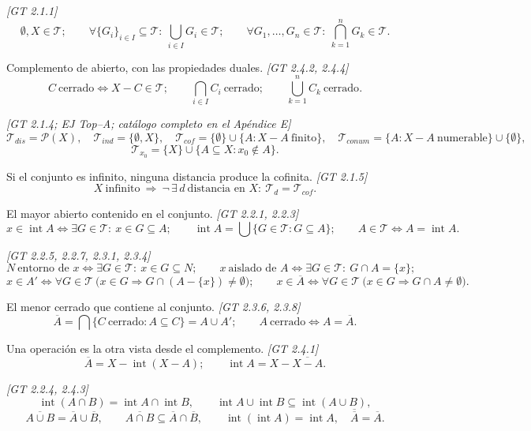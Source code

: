 \documentclass[11pt,a4paper]{article}
\theoremstyle{definition}
\theoremstyle{plain}
\newcommand{\fnt}[1]{{\normalfont\small\itshape\color{gray!150!black}[#1]}}
\newcommand{\cl}[1]{\overline{#1}}
\newcommand{\intr}{\operatorname{int}}
\newcommand{\tp}{\mathcal{T}}
\begin{document}
\begin{itemize}[leftmargin=1.3em,itemsep=3pt]

 \fnt{GT 2.1.1}
\[ \emptyset,X\in\tp;\qquad \forall\{G_i\}_{i\in I}\subseteq\tp:\ \bigcup_{i\in I}G_i\in\tp;\qquad \forall G_1,\dots,G_n\in\tp:\ \bigcap_{k=1}^n G_k\in\tp. \]

 Complemento de abierto, con las propiedades duales. \fnt{GT 2.4.2, 2.4.4}
\[ C\ \text{cerrado}\iff X-C\in\tp;\qquad \bigcap_{i\in I}C_i\ \text{cerrado};\qquad \bigcup_{k=1}^{n}C_k\ \text{cerrado}. \]

 \fnt{GT 2.1.4; EJ Top--A; catálogo completo en el Apéndice E}
\[ \tp_{dis}=\mathcal P(X),\quad \tp_{ind}=\{\emptyset,X\},\quad
\tp_{cof}=\{\emptyset\}\cup\{A: X-A\ \text{finito}\},\quad
\tp_{conum}=\{A: X-A\ \text{numerable}\}\cup\{\emptyset\}, \]
\[ \tp_{x_0}=\{X\}\cup\{A\subseteq X: x_0\notin A\}. \]

 Si el conjunto es infinito, ninguna distancia produce la cofinita. \fnt{GT 2.1.5}
\[ X\ \text{infinito}\ \Rightarrow\ \neg\,\exists\,d\ \text{distancia en } X:\ \tp_d=\tp_{cof}. \]

 El mayor abierto contenido en el conjunto. \fnt{GT 2.2.1, 2.2.3}
\[ x\in\intr A\iff \exists G\in\tp:\ x\in G\subseteq A;\qquad \intr A=\bigcup\{G\in\tp: G\subseteq A\};\qquad A\in\tp\iff A=\intr A. \]

 \fnt{GT 2.2.5, 2.2.7, 2.3.1, 2.3.4}
\[ N\ \text{entorno de } x\iff \exists G\in\tp:\ x\in G\subseteq N;\qquad
x\ \text{aislado de } A\iff \exists G\in\tp:\ G\cap A=\{x\}; \]
\[ x\in A'\iff \forall G\in\tp\ \big(x\in G\Rightarrow G\cap(A-\{x\})\ne\emptyset\big);\qquad
x\in\cl A\iff \forall G\in\tp\ \big(x\in G\Rightarrow G\cap A\ne\emptyset\big). \]

 El menor cerrado que contiene al conjunto. \fnt{GT 2.3.6, 2.3.8}
\[ \cl A=\bigcap\{C\ \text{cerrado}: A\subseteq C\}=A\cup A';\qquad A\ \text{cerrado}\iff A=\cl A. \]

 Una operación es la otra vista desde el complemento. \fnt{GT 2.4.1}
\[ \cl A=X-\intr(X-A);\qquad \intr A=X-\cl{X-A}. \]

 \fnt{GT 2.2.4, 2.4.3}
\[ \intr(A\cap B)=\intr A\cap\intr B,\qquad \intr A\cup\intr B\subseteq\intr(A\cup B), \]
\[ \cl{A\cup B}=\cl A\cup\cl B,\qquad \cl{A\cap B}\subseteq\cl A\cap\cl B,\qquad \intr(\intr A)=\intr A,\quad \cl{\cl A}=\cl A. \]


\end{itemize}
\end{document}
